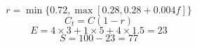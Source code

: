 \[
r=\min\{0.72,\max[0.28,0.28+0.004f]\}
\]
\[
C_t=C(1-r)
\]
\[
E=4\times3+1\times5+4\times1.5=23
\]
\[
S=100-23=77
\]

